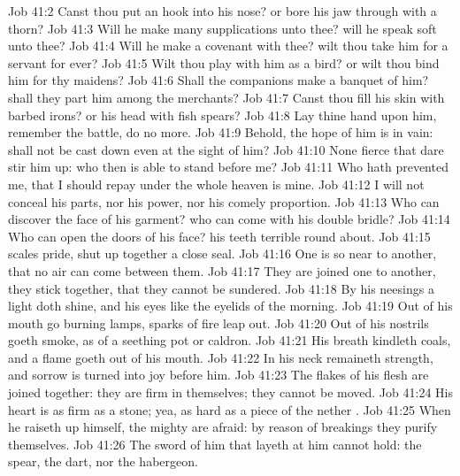 \vs Job 41:2 Canst thou put an hook into his nose? or bore his jaw through with a thorn?
\vs Job 41:3 Will he make many supplications unto thee? will he speak soft  unto thee?
\vs Job 41:4 Will he make a covenant with thee? wilt thou take him for a servant for ever?
\vs Job 41:5 Wilt thou play with him as  a bird? or wilt thou bind him for thy maidens?
\vs Job 41:6 Shall the companions make a banquet of him? shall they part him among the merchants?
\vs Job 41:7 Canst thou fill his skin with barbed irons? or his head with fish spears?
\vs Job 41:8 Lay thine hand upon him, remember the battle, do no more.
\vs Job 41:9 Behold, the hope of him is in vain: shall not  be cast down even at the sight of him?
\vs Job 41:10 None  fierce that dare stir him up: who then is able to stand before me?
\vs Job 41:11 Who hath prevented me, that I should repay  under the whole heaven is mine.
\vs Job 41:12 I will not conceal his parts, nor his power, nor his comely proportion.
\vs Job 41:13 Who can discover the face of his garment?  who can come  with his double bridle?
\vs Job 41:14 Who can open the doors of his face? his teeth  terrible round about.
\vs Job 41:15  scales  pride, shut up together  a close seal.
\vs Job 41:16 One is so near to another, that no air can come between them.
\vs Job 41:17 They are joined one to another, they stick together, that they cannot be sundered.
\vs Job 41:18 By his neesings a light doth shine, and his eyes  like the eyelids of the morning.
\vs Job 41:19 Out of his mouth go burning lamps,  sparks of fire leap out.
\vs Job 41:20 Out of his nostrils goeth smoke, as  of a seething pot or caldron.
\vs Job 41:21 His breath kindleth coals, and a flame goeth out of his mouth.
\vs Job 41:22 In his neck remaineth strength, and sorrow is turned into joy before him.
\vs Job 41:23 The flakes of his flesh are joined together: they are firm in themselves; they cannot be moved.
\vs Job 41:24 His heart is as firm as a stone; yea, as hard as a piece of the nether .
\vs Job 41:25 When he raiseth up himself, the mighty are afraid: by reason of breakings they purify themselves.
\vs Job 41:26 The sword of him that layeth at him cannot hold: the spear, the dart, nor the habergeon.
